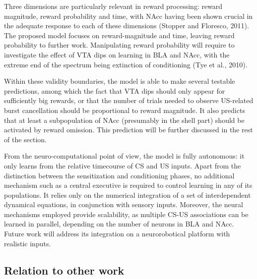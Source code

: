\documentclass[
  11pt,
  a4paper,
]{scrbook}
\begin{document}
Three dimensions are particularly relevant in reward processing: reward
magnitude, reward probability and time, with NAcc having been shown
crucial in the adequate response to each of these dimensions (Stopper
and Floresco, 2011). The proposed model focuses on reward-magnitude and
time, leaving reward probability to further work. Manipulating reward
probability will require to investigate the effect of VTA dips on
learning in BLA and NAcc, with the extreme end of the spectrum being
extinction of conditioning (Tye et al., 2010).

Within these validity boundaries, the model is able to make several
testable predictions, among which the fact that VTA dips should only
appear for sufficiently big rewards, or that the number of trials needed
to observe US-related burst cancellation should be proportional to
reward magnitude. It also predicts that at least a subpopulation of NAcc
(presumably in the shell part) should be activated by reward omission.
This prediction will be further discussed in the rest of the section.

From the neuro-computational point of view, the model is fully
autonomous: it only learns from the relative timecourse of CS and US
inputs. Apart from the distinction between the sensitization and
conditioning phases, no additional mechanism such as a central executive
is required to control learning in any of its populations. It relies
only on the numerical integration of a set of interdependent dynamical
equations, in conjunction with sensory inputs. Moreover, the neural
mechanisms employed provide scalability, as multiple CS-US associations
can be learned in parallel, depending on the number of neurons in BLA
and NAcc. Future work will address its integration on a neurorobotical
platform with realistic inputs.

\subsection{Relation to other work}\label{relation-to-other-work}
\end{document}
